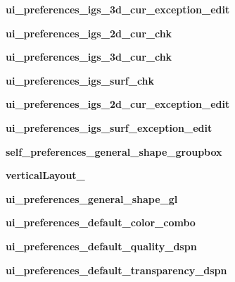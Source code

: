 \begin{DoxyCompactItemize}
{\bfseries ui\+\_\+preferences\+\_\+igs\+\_\+3d\+\_\+cur\+\_\+exception\+\_\+edit}
\item 
\hypertarget{a00113_a1ce10779ded45f28b6afd571de7c1dc4}{}\label{a00113_a1ce10779ded45f28b6afd571de7c1dc4} 
{\bfseries ui\+\_\+preferences\+\_\+igs\+\_\+2d\+\_\+cur\+\_\+chk}
\item 
\hypertarget{a00113_af72b1a9124fb421c1fbe62adb174fe77}{}\label{a00113_af72b1a9124fb421c1fbe62adb174fe77} 
{\bfseries ui\+\_\+preferences\+\_\+igs\+\_\+3d\+\_\+cur\+\_\+chk}
\item 
\hypertarget{a00113_a6ff22661fcefd7225763bd7655ceb36c}{}\label{a00113_a6ff22661fcefd7225763bd7655ceb36c} 
{\bfseries ui\+\_\+preferences\+\_\+igs\+\_\+surf\+\_\+chk}
\item 
\hypertarget{a00113_a4e600e40407001e5ea272f73f359cde8}{}\label{a00113_a4e600e40407001e5ea272f73f359cde8} 
{\bfseries ui\+\_\+preferences\+\_\+igs\+\_\+2d\+\_\+cur\+\_\+exception\+\_\+edit}
\item 
\hypertarget{a00113_a420fe65d048f3d9f4c464f5426f72928}{}\label{a00113_a420fe65d048f3d9f4c464f5426f72928} 
{\bfseries ui\+\_\+preferences\+\_\+igs\+\_\+surf\+\_\+exception\+\_\+edit}
\item 
\hypertarget{a00113_a58f750a42bbb7ed7e89fe15f5883bf3d}{}\label{a00113_a58f750a42bbb7ed7e89fe15f5883bf3d} 
{\bfseries self\+\_\+preferences\+\_\+general\+\_\+shape\+\_\+groupbox}
\item 
\hypertarget{a00113_a6cf68c068ac0041c158fb99804e4f6b2}{}\label{a00113_a6cf68c068ac0041c158fb99804e4f6b2} 
{\bfseries vertical\+Layout\+\_}
\item 
\hypertarget{a00113_a44174aad3cbdfd15fed7998607c98f74}{}\label{a00113_a44174aad3cbdfd15fed7998607c98f74} 
{\bfseries ui\+\_\+preferences\+\_\+general\+\_\+shape\+\_\+gl}
\item 
\hypertarget{a00113_a0b043ee35d1213137f70620301f00d5f}{}\label{a00113_a0b043ee35d1213137f70620301f00d5f} 
{\bfseries ui\+\_\+preferences\+\_\+default\+\_\+color\+\_\+combo}
\item 
\hypertarget{a00113_a018f3104e4bb1e4f93acdb919f43d4a7}{}\label{a00113_a018f3104e4bb1e4f93acdb919f43d4a7} 
{\bfseries ui\+\_\+preferences\+\_\+default\+\_\+quality\+\_\+dspn}
\item 
\hypertarget{a00113_a87156afaeff8f61b423a3b7cafc07619}{}\label{a00113_a87156afaeff8f61b423a3b7cafc07619} 
{\bfseries ui\+\_\+preferences\+\_\+default\+\_\+transparency\+\_\+dspn}
\item 
\hypertarget{a00113_af4af1d948631ab4e16506f3dc6ad476d}{}\label{a00113_af4af1d948631ab4e16506f3dc6ad476d} 

\end{DoxyCompactItemize}
